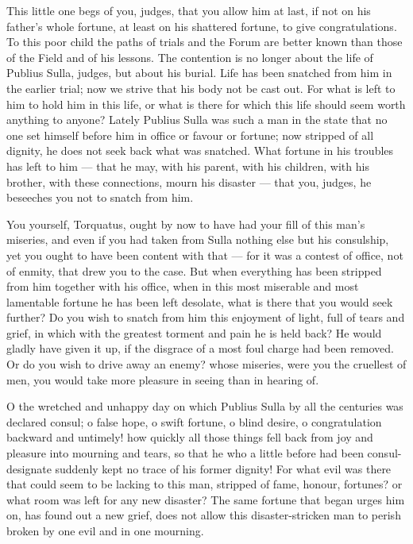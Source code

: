  This little one begs of you, judges, that you allow him at last, if not on his father's whole fortune, at least on his shattered fortune, to give congratulations. To this poor child the paths of trials and the Forum are better known than those of the Field and of his lessons. The contention is no longer about the life of Publius Sulla, judges, but about his burial. Life has been snatched from him in the earlier trial; now we strive that his body not be cast out. For what is left to him to hold him in this life, or what is there for which this life should seem worth anything to anyone? Lately Publius Sulla was such a man in the state that no one set himself before him in office or favour or fortune; now stripped of all dignity, he does not seek back what was snatched. What fortune in his troubles has left to him --- that he may, with his parent, with his children, with his brother, with these connections, mourn his disaster --- that you, judges, he beseeches you not to snatch from him.

 You yourself, Torquatus, ought by now to have had your fill of this man's miseries, and even if you had taken from Sulla nothing else but his consulship, yet you ought to have been content with that --- for it was a contest of office, not of enmity, that drew you to the case. But when everything has been stripped from him together with his office, when in this most miserable and most lamentable fortune he has been left desolate, what is there that you would seek further? Do you wish to snatch from him this enjoyment of light, full of tears and grief, in which with the greatest torment and pain he is held back? He would gladly have given it up, if the disgrace of a most foul charge had been removed. Or do you wish to drive away an enemy? whose miseries, were you the cruellest of men, you would take more pleasure in seeing than in hearing of.

 O the wretched and unhappy day on which Publius Sulla by all the centuries was declared consul; o false hope, o swift fortune, o blind desire, o congratulation backward and untimely! how quickly all those things fell back from joy and pleasure into mourning and tears, so that he who a little before had been consul-designate suddenly kept no trace of his former dignity! For what evil was there that could seem to be lacking to this man, stripped of fame, honour, fortunes? or what room was left for any new disaster? The same fortune that began urges him on, has found out a new grief, does not allow this disaster-stricken man to perish broken by one evil and in one mourning.

